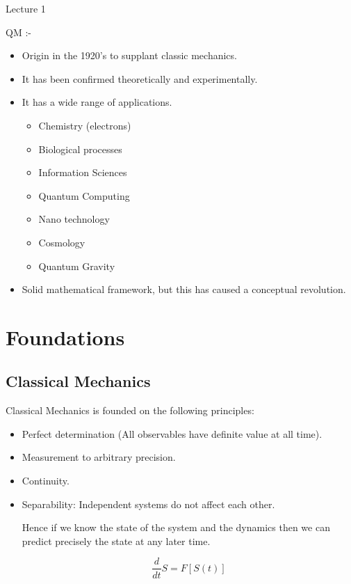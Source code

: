 \begin{center}

Lecture 1

\end{center}

QM :- 

\begin{itemize}

\item Origin in the 1920's to supplant classic mechanics. 
\item It has been confirmed theoretically and experimentally.
\item It has a wide range of applications.
	\begin{itemize}
	\item Chemistry (electrons)
	\item Biological processes
	\item Information Sciences
	\item Quantum Computing
	\item Nano technology
	\item Cosmology
	\item Quantum Gravity
	\end{itemize}

\item Solid mathematical framework, but this has caused a conceptual revolution.

\end{itemize}

\section{Foundations}

\subsection{Classical Mechanics}

Classical Mechanics is founded on the following principles:

\begin{itemize}

\item Perfect determination (All observables have definite value at all time).

\item Measurement to arbitrary precision.

\item Continuity.

\item Separability: Independent systems do not affect each other.

Hence if we know the state of the system and the dynamics then we can predict precisely the state at any later time. 

$$ \frac{d}{dt} S = F[S(t)] $$

\end{itemize}


